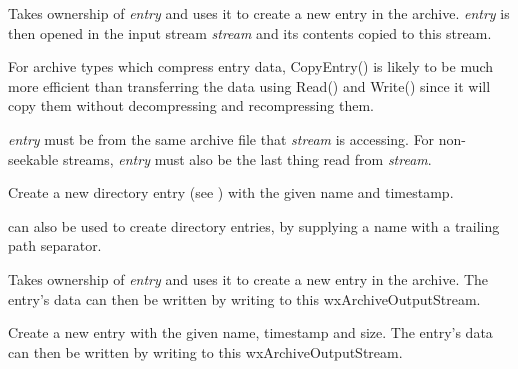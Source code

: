 
Takes ownership of {\it entry} and uses it to create a new entry in the
archive. {\it entry} is then opened in the input stream {\it stream}
and its contents copied to this stream.

For archive types which compress entry data, CopyEntry() is likely to be
much more efficient than transferring the data using Read() and Write()
since it will copy them without decompressing and recompressing them.

{\it entry} must be from the same archive file that {\it stream} is
accessing. For non-seekable streams, {\it entry} must also be the last
thing read from {\it stream}.


\label{wxarchiveoutputstreamputnextdirentry}


Create a new directory entry
(see )
with the given name and timestamp.

 can
also be used to create directory entries, by supplying a name with
a trailing path separator.


\label{wxarchiveoutputstreamputnextentry}


Takes ownership of {\it entry} and uses it to create a new entry in
the archive. The entry's data can then be written by writing to this
wxArchiveOutputStream.


Create a new entry with the given name, timestamp and size. The entry's
data can then be written by writing to this wxArchiveOutputStream.


